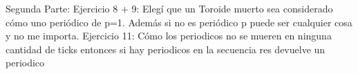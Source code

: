 \documentclass[a4paper]{article}
\begin{document}
Segunda Parte: 
    Ejercicio 8 + 9: Elegí que un Toroide muerto sea considerado cómo uno periódico de p=1.
    Además si no es periódico p puede ser cualquier cosa y no me importa.
    Ejercicio 11: Cómo los periodicos no se mueren en ninguna cantidad de ticks entonces si hay periodicos en la secuencia res devuelve un periodico
\end{document}
